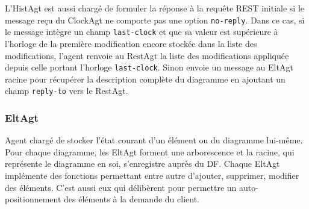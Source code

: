 L'HistAgt est aussi chargé de formuler la réponse à la requête REST initiale si le message reçu du ClockAgt ne comporte pas une option \lstinline$no-reply$.
Dans ce cas, si le message intègre un champ \lstinline$last-clock$ et que sa valeur est supérieure à l'horloge de la première modification encore stockée dans la liste des modifications, l'agent renvoie au RestAgt la liste des modifications appliquée depuis celle portant l'horloge \lstinline$last-clock$.
Sinon envoie un message au EltAgt racine pour récupérer la description complète du diagramme en ajoutant un champ \lstinline$reply-to$ vers le RestAgt.

\subsubsection{EltAgt}
Agent chargé de stocker l'état courant d'un élément ou du diagramme lui-même.
Pour chaque diagramme, les EltAgt forment une arborescence et la racine, qui représente le diagramme en soi, s'enregistre auprès du DF.
Chaque EltAgt implémente des fonctions permettant entre autre d'ajouter, supprimer, modifier des éléments.
C'est aussi eux qui délibèrent pour permettre un auto-positionnement des éléments à la demande du client.


